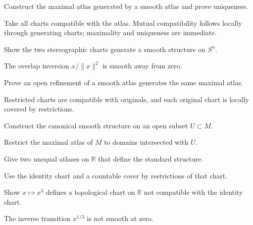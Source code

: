 \begin{problem}\label{prob:vii02-06}
Construct the maximal atlas generated by a smooth atlas and prove uniqueness.
\end{problem}
\begin{solution}
Take all charts compatible with the atlas. Mutual compatibility follows locally through generating charts; maximality and uniqueness are immediate.
\end{solution}

\begin{problem}\label{prob:vii02-07}
Show the two stereographic charts generate a smooth structure on \(S^n\).
\end{problem}
\begin{solution}
The overlap inversion \(x/\|x\|^2\) is smooth away from zero.
\end{solution}

\begin{problem}\label{prob:vii02-08}
Prove an open refinement of a smooth atlas generates the same maximal atlas.
\end{problem}
\begin{solution}
Restricted charts are compatible with originals, and each original chart is locally covered by restrictions.
\end{solution}

\begin{problem}\label{prob:vii02-09}
Construct the canonical smooth structure on an open subset \(U\subset M\).
\end{problem}
\begin{solution}
Restrict the maximal atlas of \(M\) to domains intersected with \(U\).
\end{solution}

\begin{problem}\label{prob:vii02-10}
Give two unequal atlases on \(\mathbb R\) that define the standard structure.
\end{problem}
\begin{solution}
Use the identity chart and a countable cover by restrictions of that chart.
\end{solution}

\begin{problem}\label{prob:vii02-11}
Show \(x\mapsto x^3\) defines a topological chart on \(\mathbb R\) not compatible with the identity chart.
\end{problem}
\begin{solution}
The inverse transition \(x^{1/3}\) is not smooth at zero.
\end{solution}

